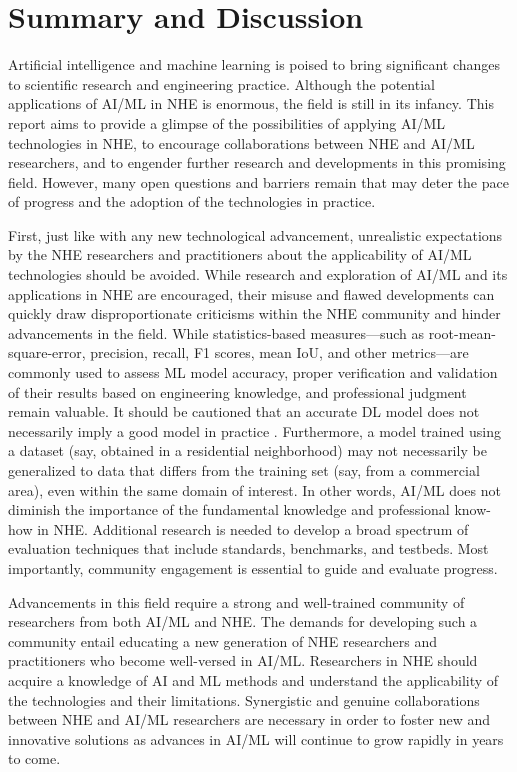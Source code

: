 \section{Summary and Discussion}
\label{sec:ai_summary}

Artificial intelligence and machine learning is poised to bring significant changes to scientific research and engineering practice. Although the potential applications of AI/ML in NHE is enormous, the field is still in its infancy. This report aims to provide a glimpse of the possibilities of applying AI/ML technologies in NHE, to encourage collaborations between NHE and AI/ML researchers, and to engender further research and developments in this promising field. However, many open questions and barriers remain that may deter the pace of progress and the adoption of the technologies in practice. 

First, just like with any new technological advancement, unrealistic expectations by the NHE researchers and practitioners about the applicability of AI/ML technologies should be avoided. While research and exploration of AI/ML and its applications in NHE are encouraged, their misuse and flawed developments can quickly draw disproportionate criticisms within the NHE community and hinder advancements in the field. While statistics-based measures---such as root-mean-square-error, precision, recall, F1 scores, mean IoU, and other metrics---are commonly used to assess ML model accuracy, proper verification and validation of their results based on engineering knowledge, and professional judgment remain valuable. It should be cautioned that an accurate DL model does not necessarily imply a good model in practice \citep{mignan2019forecasting}. Furthermore, a model trained using a dataset (say, obtained in a residential neighborhood) may not necessarily be generalized to data that differs from the training set (say, from a commercial area), even within the same domain of interest. In other words, AI/ML does not diminish the importance of the fundamental knowledge and professional know-how in NHE. Additional research is needed to develop a broad spectrum of evaluation techniques that include standards, benchmarks, and testbeds. Most importantly, community engagement is essential to guide and evaluate progress. 

Advancements in this field require a strong and well-trained community of researchers from both AI/ML and NHE. The demands for developing such a community entail educating a new generation of NHE researchers and practitioners who become well-versed in AI/ML. Researchers in NHE should acquire a knowledge of AI and ML methods and understand the applicability of the technologies and their limitations. Synergistic and genuine collaborations between NHE and AI/ML researchers are necessary in order to foster new and innovative solutions as advances in AI/ML will continue to grow rapidly in years to come. 

